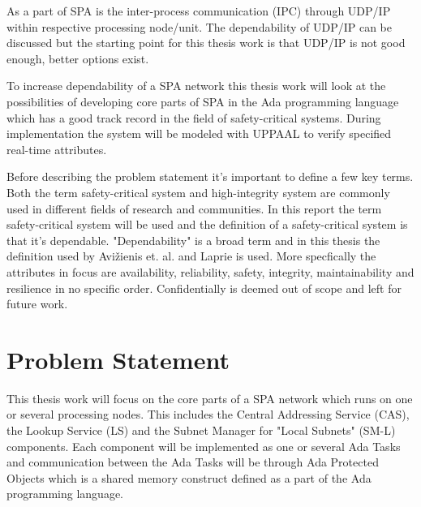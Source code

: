 As a part of SPA is the inter-process communication (IPC)
through UDP/IP within respective processing node/unit. The dependability of
UDP/IP can be discussed but the starting point for this thesis work is that
UDP/IP is not good enough, better options exist.


To increase dependability of a SPA network this thesis work will look at the
possibilities of developing core parts of SPA in the Ada programming language
which has a good track record in the field of safety-critical systems.
During implementation the system will be modeled with UPPAAL to verify
specified real-time attributes.

Before describing the problem statement it's important to define a few key
terms. Both the term safety-critical system and high-integrity system are
commonly used in different fields of research and communities. In this report
the term safety-critical system will be used and the definition of a
safety-critical system is that it's dependable.  "Dependability" is a broad
term and in this thesis the definition used by Avi\v{z}ienis et. al.
\cite{avizienis2004} and Laprie \cite{laprie2008} is used. More specfically the
attributes in focus are availability, reliability, safety, integrity,
maintainability and resilience in no specific order.  Confidentially is deemed
out of scope and left for future work.

\section{Problem Statement}



This thesis work will focus on the core parts of a SPA network which runs on
one or several processing nodes. This includes the Central Addressing Service
(CAS), the Lookup Service (LS) and the Subnet Manager for "Local Subnets"
(SM-L) components. Each component will be implemented as one or several Ada
Tasks and communication between the Ada Tasks will be through Ada Protected
Objects which is a shared memory construct defined as a part of the Ada
programming language.

